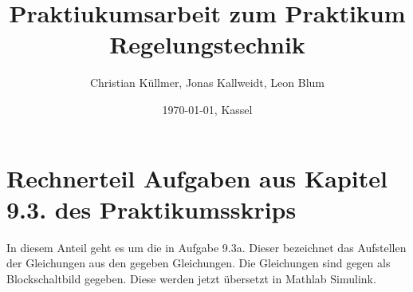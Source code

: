 \documentclass[10pt]{scrartcl}
\begin{document}
\title{Praktiukumsarbeit zum Praktikum Regelungstechnik}
\author{Christian Küllmer, Jonas Kallweidt, Leon Blum}
\date{\today{}, Kassel}
\maketitle
\newpage
\renewcommand{\contentsname}{Inhaltsverzeichnis}
\tableofcontents
\newpage
\listoffigures


\section{Rechnerteil Aufgaben aus Kapitel 9.3. des Praktikumsskrips}
In diesem Anteil geht es um die in Aufgabe 9.3a. Dieser bezeichnet das Aufstellen der Gleichungen aus den gegeben Gleichungen. Die Gleichungen sind gegen als Blockschaltbild gegeben. Diese werden jetzt übersetzt in Mathlab Simulink.



	
	


\end{document}
